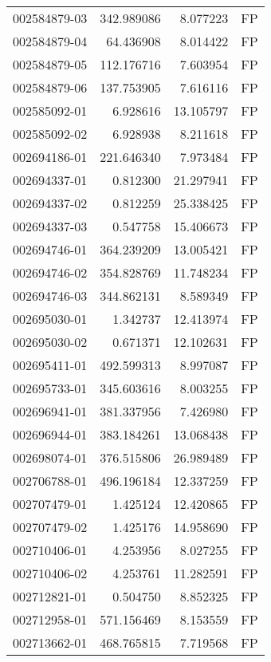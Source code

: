 \begin{tabular}{lrrl}
002584879-03 &  342.989086 &       8.077223 &   FP \\
002584879-04 &   64.436908 &       8.014422 &   FP \\
002584879-05 &  112.176716 &       7.603954 &   FP \\
002584879-06 &  137.753905 &       7.616116 &   FP \\
002585092-01 &    6.928616 &      13.105797 &   FP \\
002585092-02 &    6.928938 &       8.211618 &   FP \\
002694186-01 &  221.646340 &       7.973484 &   FP \\
002694337-01 &    0.812300 &      21.297941 &   FP \\
002694337-02 &    0.812259 &      25.338425 &   FP \\
002694337-03 &    0.547758 &      15.406673 &   FP \\
002694746-01 &  364.239209 &      13.005421 &   FP \\
002694746-02 &  354.828769 &      11.748234 &   FP \\
002694746-03 &  344.862131 &       8.589349 &   FP \\
002695030-01 &    1.342737 &      12.413974 &   FP \\
002695030-02 &    0.671371 &      12.102631 &   FP \\
002695411-01 &  492.599313 &       8.997087 &   FP \\
002695733-01 &  345.603616 &       8.003255 &   FP \\
002696941-01 &  381.337956 &       7.426980 &   FP \\
002696944-01 &  383.184261 &      13.068438 &   FP \\
002698074-01 &  376.515806 &      26.989489 &   FP \\
002706788-01 &  496.196184 &      12.337259 &   FP \\
002707479-01 &    1.425124 &      12.420865 &   FP \\
002707479-02 &    1.425176 &      14.958690 &   FP \\
002710406-01 &    4.253956 &       8.027255 &   FP \\
002710406-02 &    4.253761 &      11.282591 &   FP \\
002712821-01 &    0.504750 &       8.852325 &   FP \\
002712958-01 &  571.156469 &       8.153559 &   FP \\
002713662-01 &  468.765815 &       7.719568 &   FP \\

\end{tabular}
